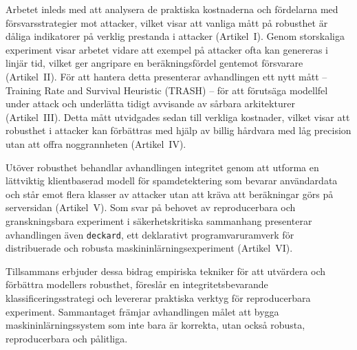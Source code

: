 Arbetet inleds med att analysera de praktiska kostnaderna och fördelarna med försvarsstrategier mot attacker, vilket visar att vanliga mått på robusthet är dåliga indikatorer på verklig prestanda i attacker (Artikel~I).
Genom storskaliga experiment visar arbetet vidare att exempel på attacker ofta kan genereras i linjär tid, vilket ger angripare en beräkningsfördel gentemot försvar\-are (Artikel~II).
För att hantera detta presenterar avhandlingen ett nytt mått – Training Rate and Survival Heuristic (TRASH) – för att förutsäga modellfel under attack och underlätta tidigt avvisande av sårbara arkitekturer (Artikel~III).
Detta mått utvidgades sedan till verkliga kostnader, vilket visar att robusthet i attacker kan förbättras med hjälp av billig hårdvara med låg precision utan att offra noggrannheten (Artikel~IV).

Utöver robusthet behandlar avhandlingen integritet genom att utforma en lättviktig klientbaserad modell för spamdetektering som bevarar användardata och står emot flera klasser av attacker utan att kräva att beräkningar görs på serversidan (Artikel~V).
Som svar på behovet av reproducerbara och gransk\-ningsbara experiment i säkerhetskritiska sammanhang presenterar avhandlingen även \texttt{deckard}, ett deklarativt programvaruramverk för distribuerade och robusta maskininlärningsexperiment (Artikel~VI).

Tillsammans erbjuder dessa bidrag empiriska tekniker för att utvärdera och förbättra modellers robusthet, föreslår en integritetsbevarande klassificeringsstrategi och levererar praktiska verktyg för reproducerbara experiment.
Sammantaget främjar avhandlingen målet att bygga maskininlärningssystem som inte bara är korrekta, utan också robusta, reproducerbara och pålitliga.